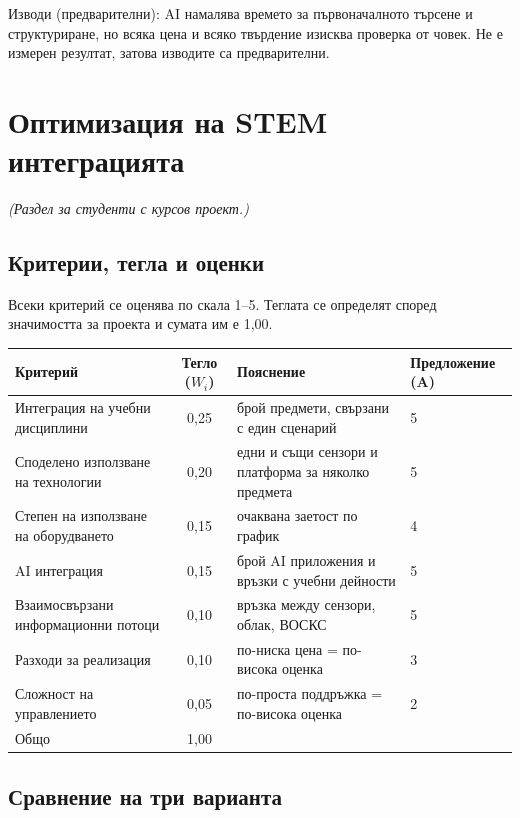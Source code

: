 \documentclass[11pt,a4paper]{article}
\begin{document}
Изводи (предварителни): AI намалява времето за първоначалното търсене и структуриране, но всяка цена и всяко твърдение изисква проверка от човек. Не е измерен резултат, затова изводите са предварителни.

\section{Оптимизация на STEM интеграцията}

\textit{(Раздел за студенти с курсов проект.)}

\subsection{Критерии, тегла и оценки}

Всеки критерий се оценява по скала 1--5. Теглата се определят според значимостта за проекта и сумата им е 1,00.

\begin{tabularx}{\textwidth}{@{}>{\raggedright\arraybackslash}p{5.2cm}cXX@{}}
\toprule
Критерий & Тегло ($W_i$) & Пояснение & Предложение (A) \\
\midrule
Интеграция на учебни дисциплини & 0{,}25 & брой предмети, свързани с един сценарий & 5 \\
Споделено използване на технологии & 0{,}20 & едни и същи сензори и платформа за няколко предмета & 5 \\
Степен на използване на оборудването & 0{,}15 & очаквана заетост по график & 4 \\
AI интеграция & 0{,}15 & брой AI приложения и връзки с учебни дейности & 5 \\
Взаимосвързани информационни потоци & 0{,}10 & връзка между сензори, облак, ВОСКС & 5 \\
Разходи за реализация & 0{,}10 & по-ниска цена = по-висока оценка & 3 \\
Сложност на управлението & 0{,}05 & по-проста поддръжка = по-висока оценка & 2 \\
\midrule
Общо & 1{,}00 & & \\
\bottomrule
\end{tabularx}

\subsection{Сравнение на три варианта}
\end{document}
